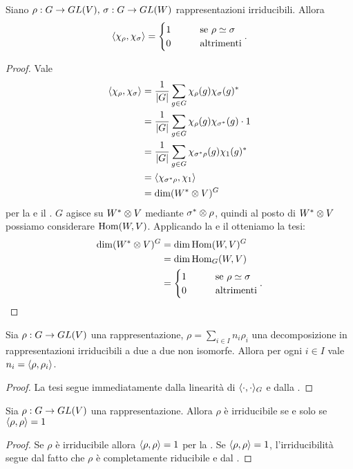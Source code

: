 \begin{proposition}
Siano $\rho:G\to GL(V),\,\allowbreak\sigma:G\to GL(W)$ rappresentazioni irriducibili. Allora 
$$
\langle\chi_\rho,\chi_\sigma\rangle=
\begin{cases}
1\qquad&\text{se $\rho\simeq\sigma$}\\
0\qquad&\text{altrimenti}
\end{cases}.
$$
\end{proposition}
\begin{proof}
Vale
\begin{align*}
\langle\chi_\rho,\chi_\sigma\rangle&=\frac{1}{|G|}\sum_{g\in G}\chi_\rho(g)\chi_\sigma(g)^*\\
&=\frac{1}{|G|}\sum_{g\in G}\chi_\rho(g)\chi_{\sigma^*}(g)\cdot1\\
&=\frac{1}{|G|}\sum_{g\in G}\chi_{\sigma^*\rho}(g)\chi_1(g)^*\\
&=\langle\chi_{\sigma^*\rho},\chi_1\rangle\\
&=\dim(W^*\otimes V)^G
\end{align*}
per la  e il . $G$ agisce su $W^*\otimes V$ mediante $\sigma^*\otimes\rho$, quindi al posto di $W^*\otimes V$ possiamo considerare $\operatorname{Hom}(W,V)$. Applicando la  e il  otteniamo la tesi:
\begin{align*}
\dim(W^*\otimes V)^G&=\dim\operatorname{Hom}(W,V)^G\\
&=\dim\operatorname{Hom}_G(W,V)\\
&=
\begin{cases}
1\qquad&\text{se $\rho\simeq\sigma$}\\
0\qquad&\text{altrimenti}
\end{cases}.
\end{align*}
\end{proof}

\begin{corollary}
Sia $\rho:G\to GL(V)$ una rappresentazione, $\rho=\sum_{i\in I}n_i\rho_i$ una decomposizione in rappresentazioni irriducibili a due a due non isomorfe. Allora per ogni $i\in I$ vale $n_i=\langle\rho,\rho_i\rangle$.
\end{corollary}
\begin{proof}
La tesi segue immediatamente dalla linearità di $\langle\cdot,\cdot\rangle_G$ e dalla .
\end{proof}

\begin{corollary}
Sia $\rho:G\to GL(V)$ una rappresentazione. Allora $\rho$ è irriducibile se e solo se $\langle\rho,\rho\rangle=1$
\end{corollary}
\begin{proof}
Se $\rho$ è irriducibile allora $\langle\rho,\rho\rangle=1$ per la . Se $\langle\rho,\rho\rangle=1$, l'irriducibilità segue dal fatto che $\rho$ è completamente riducibile e dal .
\end{proof}




